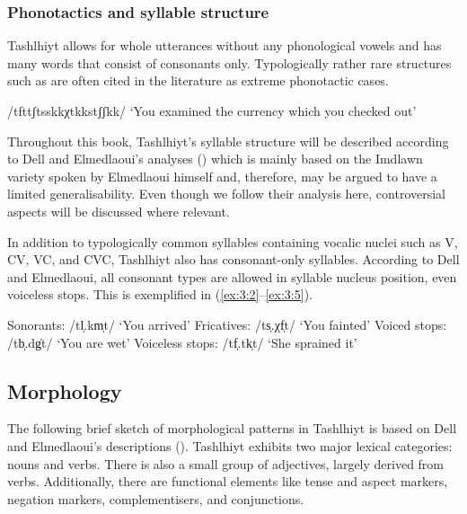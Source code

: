 \subsubsection{Phonotactics and syllable structure}
Tashlhiyt allows for whole utterances without any phonological vowels and has many words that consist of consonants only. Typologically rather rare structures such as  are often cited in the literature as extreme phonotactic cases. 

\begin{exe}
\ex\label{ex:3:1}   /tfttʃtsskkχtkkstʃʃkk/ \newline
‘You examined the currency which you checked out’ 
\end{exe}

Throughout this book, Tashlhiyt’s syllable structure will be described according to Dell and Elmedlaoui’s analyses (\citealt{DE1985,DE1988,DE1996,DE2002}) which is mainly based on the Imdlawn variety spoken by Elmedlaoui himself and, therefore, may be argued to have a limited generalisability. Even though we follow their analysis here, controversial aspects will be discussed where relevant. 

In addition to typologically common syllables containing vocalic nuclei such as V, CV, VC, and CVC, Tashlhiyt also has consonant-only syllables. According to Dell and Elmedlaoui, all consonant types are allowed in syllable nucleus position, even voiceless stops. This is exemplified in (\ref{ex:3:2}--\ref{ex:3:5}). 

\begin{exe}
\ex\label{ex:3:2}   Sonorants: /tl̩.km̩t/	‘You arrived’
\ex\label{ex:3:3} 	  Fricatives: /ts̩.χf̩t/ ‘You fainted’
\ex\label{ex:3:4}   Voiced stops: /tb̩.dg̍t/ ‘You are wet’
\ex\label{ex:3:5} 	  Voiceless stops: /tf̩.tk̩t/ ‘She sprained it’
\end{exe}

\subsection{Morphology}\label{sec:3.4.3}
The following brief sketch of morphological patterns in Tashlhiyt is based on Dell and Elmedlaoui’s descriptions (\citealt{DE1988,DE2002}). Tashlhiyt exhibits two major lexical categories: nouns and verbs. There is also a small group of adjectives, largely derived from verbs. Additionally, there are functional elements like tense and aspect markers, negation markers, complementisers, and conjunctions.

